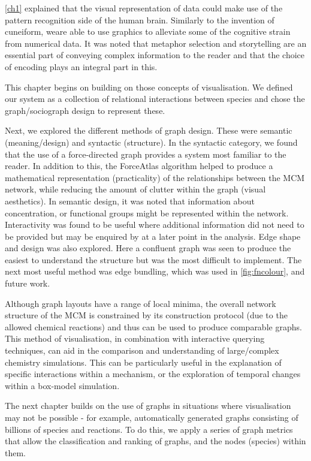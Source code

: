 \autoref{ch1} explained that the visual representation of data could make use of the pattern recognition side of the human brain. Similarly to the invention of cuneiform, weare able to use graphics to alleviate some of the cognitive strain from numerical data. It was noted that metaphor selection and storytelling are an essential part of conveying complex information to the reader and that the choice of encoding plays an integral part in this.

This chapter begins on building on those concepts of visualisation. We defined our system as a collection of relational interactions between species and chose the graph/sociograph design to represent these.

Next, we explored the different methods of graph design. These were semantic (meaning/design) and syntactic (structure). In the syntactic category, we found that the use of a force-directed graph provides a system most familiar to the reader. In addition to this, the ForceAtlas algorithm helped to produce a mathematical representation (practicality) of the relationships between the MCM network, while reducing the amount of clutter within the graph (visual aesthetics). In semantic design, it was noted that information about concentration, or functional groups might be represented within the network. Interactivity was found to be useful where additional information did not need to be provided but may be enquired by at a later point in the analysis. Edge shape and design was also explored. Here a confluent graph was seen to produce the easiest to understand the structure but was the most difficult to implement. The next most useful method was edge bundling, which was used in \autoref{fig:fncolour}, and future work.

Although graph layouts have a range of local minima, the overall network structure of the MCM is constrained by its construction protocol (due to the allowed chemical reactions) and thus can be used to produce comparable graphs. This method of visualisation, in combination with interactive querying techniques, can aid in the comparison and understanding of large/complex chemistry simulations. This can be particularly useful in the explanation of specific interactions within a mechanism, or the exploration of temporal changes within a box-model simulation.

The next chapter builds on the use of graphs in situations where visualisation may not be possible - for example, automatically generated graphs consisting of billions of species and reactions. To do this, we apply a series of graph metrics that allow the classification and ranking of graphs, and the nodes (species) within them.

